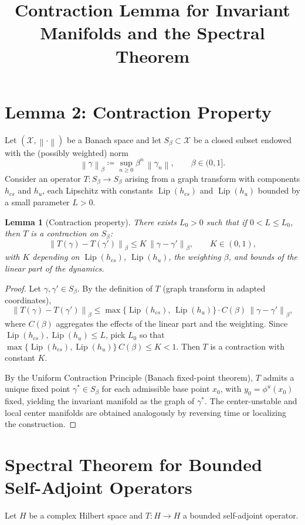 \documentclass[11pt]{article}
\title{Contraction Lemma for Invariant Manifolds and the Spectral Theorem}
\author{}
\date{}
\theoremstyle{plain}
\newtheorem{lemma}{Lemma}
\theoremstyle{definition}
\newcommand{\norm}[1]{\left\lVert #1 \right\rVert}
\begin{document}
\maketitle

\section{Lemma 2: Contraction Property}
Let $(\mathcal{X},\norm{\cdot})$ be a Banach space and let $S_\beta \subset \mathcal{X}$ be a closed subset endowed with the (possibly weighted) norm
\[
\norm{\gamma}_{\beta} \coloneqq \sup_{n \ge 0} \beta^{n}\,\norm{\gamma_n},\qquad \beta \in (0,1].
\]
Consider an operator $T:S_\beta \to S_\beta$ arising from a graph transform with components $h_{cs}$ and $h_{u}$, each Lipschitz with constants $\operatorname{Lip}(h_{cs})$ and $\operatorname{Lip}(h_u)$ bounded by a small parameter $L>0$.

\begin{lemma}[Contraction property]
There exists $L_0>0$ such that if $0<L\le L_0$, then $T$ is a contraction on $S_\beta$:
\[
\norm{T(\gamma)-T(\gamma')}_{\beta} \le K\,\norm{\gamma-\gamma'}_{\beta},\qquad K \in (0,1),
\]
with $K$ depending on $\operatorname{Lip}(h_{cs})$, $\operatorname{Lip}(h_u)$, the weighting $\beta$, and bounds of the linear part of the dynamics.
\end{lemma}

\begin{proof}
Let $\gamma,\gamma' \in S_\beta$. By the definition of $T$ (graph transform in adapted coordinates),
\[
\norm{T(\gamma)-T(\gamma')}_{\beta}
\le \max\!\big\{\operatorname{Lip}(h_{cs}),\,\operatorname{Lip}(h_u)\big\}\cdot C(\beta)\,\norm{\gamma-\gamma'}_{\beta},
\]
where $C(\beta)$ aggregates the effects of the linear part and the weighting. Since $\operatorname{Lip}(h_{cs}),\operatorname{Lip}(h_u)\le L$, pick $L_0$ so that $\max\{\operatorname{Lip}(h_{cs}),\operatorname{Lip}(h_u)\}\,C(\beta)\le K<1$. Then $T$ is a contraction with constant $K$.

By the Uniform Contraction Principle (Banach fixed-point theorem), $T$ admits a unique fixed point $\gamma^\ast\in S_\beta$ for each admissible base point $x_0$, with $y_0=\phi^u(x_0)$ fixed, yielding the invariant manifold as the graph of $\gamma^\ast$. The center-unstable and local center manifolds are obtained analogously by reversing time or localizing the construction.
\end{proof}

\section{Spectral Theorem for Bounded Self-Adjoint Operators}
Let $H$ be a complex Hilbert space and $T:H\to H$ a bounded self-adjoint operator.
\end{document}
